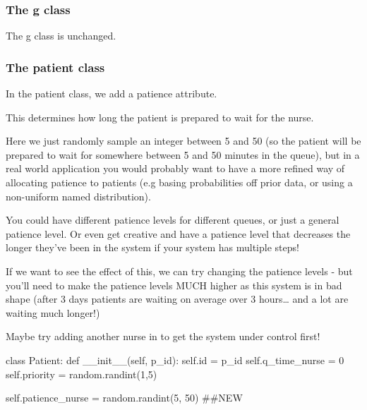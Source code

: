\documentclass[
  letterpaper,
  DIV=11,
  numbers=noendperiod]{scrreprt}
\newenvironment{Shaded}{}{}
\newcommand{\BuiltInTok}[1]{\textcolor[rgb]{0.84,0.23,0.29}{#1}}
\newcommand{\CommentTok}[1]{\textcolor[rgb]{0.42,0.45,0.49}{#1}}
\newcommand{\DecValTok}[1]{\textcolor[rgb]{0.00,0.36,0.77}{#1}}
\newcommand{\FunctionTok}[1]{\textcolor[rgb]{0.44,0.26,0.76}{#1}}
\newcommand{\KeywordTok}[1]{\textcolor[rgb]{0.84,0.23,0.29}{#1}}
\newcommand{\NormalTok}[1]{\textcolor[rgb]{0.14,0.16,0.18}{#1}}
\newcommand{\OperatorTok}[1]{\textcolor[rgb]{0.14,0.16,0.18}{#1}}
\newcommand{\VariableTok}[1]{\textcolor[rgb]{0.89,0.38,0.04}{#1}}
\begin{document}
\subsubsection{The g class}\label{the-g-class-5}

The g class is unchanged.

\subsubsection{The patient class}\label{the-patient-class-5}

In the patient class, we add a patience attribute.

This determines how long the patient is prepared to wait for the nurse.

Here we just randomly sample an integer between 5 and 50 (so the patient
will be prepared to wait for somewhere between 5 and 50 minutes in the
queue), but in a real world application you would probably want to have
a more refined way of allocating patience to patients (e.g basing
probabilities off prior data, or using a non-uniform named
distribution).

You could have different patience levels for different queues, or just a
general patience level. Or even get creative and have a patience level
that decreases the longer they've been in the system if your system has
multiple steps!

If we want to see the effect of this, we can try changing the patience
levels - but you'll need to make the patience levels MUCH higher as this
system is in bad shape (after 3 days patients are waiting on average
over 3 hours\ldots{} and a lot are waiting much longer!)

Maybe try adding another nurse in to get the system under control first!

\begin{Shaded}
\begin{Highlighting}[]
\KeywordTok{class}\NormalTok{ Patient:}
    \KeywordTok{def} \FunctionTok{\_\_init\_\_}\NormalTok{(}\VariableTok{self}\NormalTok{, p\_id):}
        \VariableTok{self}\NormalTok{.}\BuiltInTok{id} \OperatorTok{=}\NormalTok{ p\_id}
        \VariableTok{self}\NormalTok{.q\_time\_nurse }\OperatorTok{=} \DecValTok{0}
        \VariableTok{self}\NormalTok{.priority }\OperatorTok{=}\NormalTok{ random.randint(}\DecValTok{1}\NormalTok{,}\DecValTok{5}\NormalTok{)}

        \VariableTok{self}\NormalTok{.patience\_nurse }\OperatorTok{=}\NormalTok{ random.randint(}\DecValTok{5}\NormalTok{, }\DecValTok{50}\NormalTok{) }\CommentTok{\#\#NEW}
\end{Highlighting}
\end{Shaded}
\end{document}
